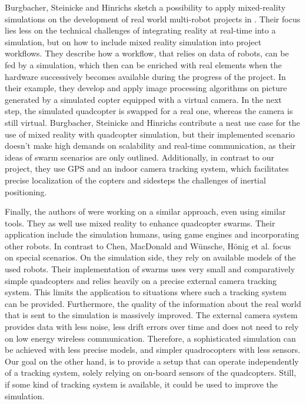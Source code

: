 Burgbacher, Steinicke and Hinrichs sketch a possibility to apply mixed-reality simulations on the development of real world multi-robot projects in \cite{Burgbacher2011}.
Their focus lies less on the technical challenges of  integrating reality at real-time into a simulation, but on how to include mixed reality simulation into project workflows.
They describe how a workflow, that relies on data of robots, can be fed by a simulation, which then can be enriched with real elements when the hardware successively becomes available during the progress of the project.
In their example, they develop and apply image processing algorithms on picture generated by a simulated copter equipped with a virtual camera. 
In the next step, the simulated quadcopter is swapped for a real one, whereas the camera is still virtual.
Burgbacher, Steinicke and Hinrichs contribute a neat use case for the use of mixed reality with quadcopter simulation, but their implemented scenario doesn't make high demands on scalability and real-time communication, as their ideas of swarm scenarios are only outlined. 
Additionally, in contrast to our project, they use GPS and an indoor camera tracking system, which facilitates precise localization of the copters and sidesteps the challenges of inertial positioning.


Finally, the authors of  \cite{Honig2015} were working on a similar approach, even using similar tools. 
They as well use mixed reality to enhance quadcopter swarms.
Their application include the simulation humans, using game engines and incorporating other robots. 
In contrast to Chen, MacDonald and Wünsche,  Hönig et al. focus on special scenarios.
On the simulation side, they rely on available models of the used robots.
Their implementation of swarms uses very small  and comparatively simple quadcopters and relies heavily on a precise external camera tracking system. 
This limits the application to situations where such a tracking system can be provided.
Furthermore, the quality of the information about the real world that is sent to the simulation is massively improved.
The external camera system provides data with less noise, less drift errors over time and does not need to rely on low energy wireless communication.
Therefore, a sophisticated simulation can be achieved with less precise models, and simpler quadrocopters with less sensors.
Our goal on the other hand, is to provide a setup that can operate independently of a tracking system, solely relying on on-board sensors of the quadcopters.
Still, if some kind of tracking system is available, it could be used to improve the simulation.




